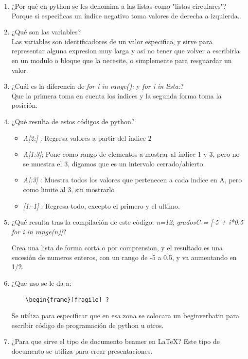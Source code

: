 \documentclass[letterpaper, 12pt, oneside]{article}%
\begin{document}
\begin{enumerate}%
	\item ¿Por qué en python se les denomina a las listas como "listas circulares"? \\
	 Porque si especificas un índice negativo toma valores de derecha a izquierda.
	
	\item ¿Qué son las variables?\\
	Las variables son identificadores de un valor especifico, y sirve para representar alguna expresion muy larga y asi no tener que volver a escribirla en un modulo o bloque que la necesite, o simplemente para resguardar un valor.
	
	\item ¿Cuál es la diferencia de \textit{for i in range():} y \textit{for i in lista:}?\\
	Que la primera toma en cuenta los índices y la segunda forma toma la posición.
	
	\item ¿Qué resulta de estos códigos de python?\\
	\begin{itemize}
		\item \textit{A[2:]} : Regresa valores a partir del índice 2
		\item \textit{A[1:3]}; Pone como rango de elementos a mostrar al índice 1 y 3, pero no se muestra el 3, digamos que es un intervalo cerrado/abierto.
		\item \textit{A[:3]} : Muestra todos los valores que pertenecen a cada indice en A, pero como limite al 3, sin mostrarlo
		\item \textit{[1:-1]}  : Regresa todo, excepto el primero y el ultimo.
	\end{itemize}
	
	\item ¿Qué resulta tras la compilación de este código: {\textit{n=12; gradosC = [-5 + i*0.5 for i in range(n)]}}?
	
	Crea una lista de forma corta o por comprension, y el resultado es una sucesión de numeros enteros, con un rango de -5 a 0.5, y va aumentando en 1/2.
		
	
	\item ¿Que uso se le da a: \begin{verbatim}
	\begin{frame}[fragile] ?
	\end{verbatim}
	
	Se utiliza para especificar que en esa zona se colocara un begin{verbatin} para escribir código de programación de python u otros.
	
	
	\item ¿Para que sirve el tipo de documento beamer en \LaTeX?
	Este tipo de documento se utiliza para crear presentaciones.
	
	 
	
	
	
	
	
\end{enumerate}%
\end{document}
